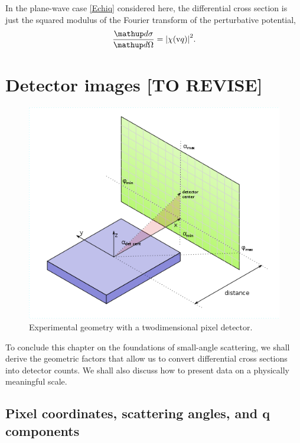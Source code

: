 In the plane-wave case \cref{Echiq} considered here,
the differential cross section is just the squared modulus
of the Fourier transform of the perturbative potential,
\begin{equation}\label{Ecross1}
  \frac{\d\sigma}{\d\Omega}
  = {\left| \chi(\q) \right|}^2.
\end{equation}

\section{Detector images [TO REVISE]}\label{SdetImg}

\def\tc{\text{c}}

\begin{figure}[t]
\begin{center}
\includegraphics[width=.5\textwidth]{fig/drawing/experimental_geometry.png}
\end{center}
\caption{Experimental geometry with a twodimensional pixel detector.}
\label{FexpGeom}
\end{figure}

To conclude this chapter on the foundations of small-angle scattering,
we shall derive the geometric factors
that allow us to convert differential cross sections into detector counts.
We shall also discuss how to present data on a physically meaningful scale.

\subsection{Pixel coordinates, scattering angles, and $\symbf{q}$ components}

